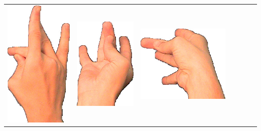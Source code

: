 \documentclass{article}
\begin{document}
\begin{center}
\begin{tabular}{r*{6}{c}}
\includegraphics[scale=0.1]{images/08-02-3.jpg}&
\includegraphics[scale=0.1]{images/08-02-4.jpg}&
\includegraphics[scale=0.1]{images/08-02-5.jpg}&

\end{tabular}
\end{center}
\end{document}
